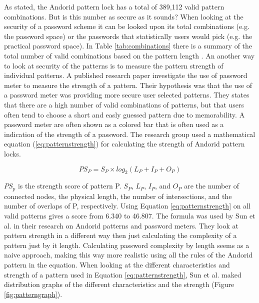  As stated, the Andorid pattern lock has a total of 389,112 valid pattern combinations. But is this number as secure as it sounds? When looking at the security of a password scheme it can be looked upon its total combinations (e.g. the password space) or the passwords that statistically users would pick (e.g. the practical password space). In Table \ref{tab:combinations} there is a summary of the total number of valid combinations based on the pattern length \cite{Sun}. An another way to look at security of the patterns is to measure the pattern strength of individual patterns. A published research paper investigate the use of password meter to measure the strength of a pattern. Their hypothesis was that the use of a password meter was providing more secure user selected patterns. They states that there are a high number of valid combinations of patterns, but that users often tend to choose a short and easly guessed pattern due to memorability. A password meter are often shown as a colored bar that is often used as a indication of the strength of a password. The research group used a mathematical equation (\ref{eq:patternstrength}) for calculating the strength of Andorid pattern locks. 

    \begin{equation}\label{eq:patternstrength}
      PS_{P} = S_{P} \times log_{2}(L_{P} + I_{P} + O_{P})
    \end{equation}

  $PS_{p}$ is the strength score of pattern P. $S_{P}$, $L_{P}$, $I_{P}$, and $O_{P}$ are the number of connected nodes, the physical length, the number of intersections, and the number of overlaps of P, respectively. Using Equation \ref{eq:patternstrength} on all valid patterns gives a score from 6.340 to 46.807. The formula was used by Sun et al. \cite{Sun} in their research on Andorid patterns and password meters. They look at pattern strength in a different way then just calculating the complexity of a pattern just by it length. Calculating password complexity by length seems as a naive approach, making this way more realistic using all the rules of the Andorid pattern in the equation. When looking at the different characteristics and strength of a pattern used in Equation \ref{eq:patternstrength}, Sun et al. maked distribution graphs of the different characteristics and the strength (Figure \ref{fig:patterngraph}).

